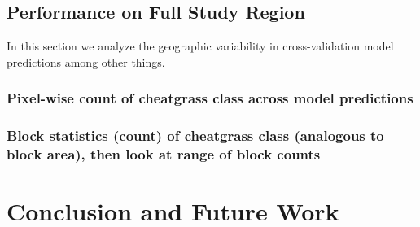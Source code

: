 \def\year{2017}\relax \documentclass[letterpaper]{article}
\begin{document}
\subsection{Performance on Full Study Region}
In this section we analyze the geographic variability in cross-validation model predictions among other things.
\subsubsection{Pixel-wise count of cheatgrass class across model predictions}
\subsubsection{Block statistics (count) of cheatgrass class (analogous to block area), then look at range of block counts}
\section{Conclusion and Future Work}
\nocite{*}


\end{document}
